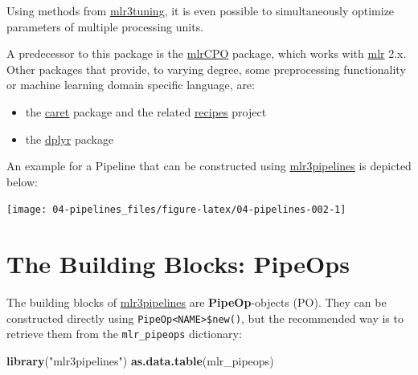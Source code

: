 \documentclass[]{scrbook}
\newenvironment{Shaded}{\begin{snugshade}}{\end{snugshade}}
\newcommand{\KeywordTok}[1]{\textcolor[rgb]{0.13,0.29,0.53}{\textbf{#1}}}
\newcommand{\NormalTok}[1]{#1}
\newcommand{\StringTok}[1]{\textcolor[rgb]{0.31,0.60,0.02}{#1}}
\providecommand{\tightlist}{%
  \setlength{\itemsep}{0pt}\setlength{\parskip}{0pt}}
\renewenvironment{Shaded} {\begin{snugshade}\small} {\end{snugshade}}
\begin{document}
Using methods from \href{https://mlr3tuning.mlr-org.com}{mlr3tuning}, it is even possible to simultaneously optimize parameters of multiple processing units.

A predecessor to this package is the \href{https://cran.r-project.org/package=mlrCPO}{mlrCPO} package, which works with \href{https://cran.r-project.org/package=mlr}{mlr} 2.x.
Other packages that provide, to varying degree, some preprocessing functionality or machine learning domain specific language, are:

\begin{itemize}
\tightlist
\item
  the \href{https://cran.r-project.org/package=caret}{caret} package and the related \href{https://cran.r-project.org/package=recipes}{recipes} project
\item
  the \href{https://cran.r-project.org/package=dplyr}{dplyr} package
\end{itemize}

An example for a Pipeline that can be constructed using \href{https://mlr3pipelines.mlr-org.com}{mlr3pipelines} is depicted below:

\begin{center}\texttt{[image: 04-pipelines\_files/figure-latex/04-pipelines-002-1]} \end{center}

\hypertarget{pipe-pipeops}{%
\section{The Building Blocks: PipeOps}\label{pipe-pipeops}}

The building blocks of \href{https://mlr3pipelines.mlr-org.com}{mlr3pipelines} are \textbf{PipeOp}-objects (PO).
They can be constructed directly using \texttt{PipeOp\textless{}NAME\textgreater{}\$new()}, but the recommended way is to retrieve them from the \texttt{mlr\_pipeops} dictionary:

\begin{Shaded}
\begin{Highlighting}[]
\KeywordTok{library}\NormalTok{(}\StringTok{"mlr3pipelines"}\NormalTok{)}
\KeywordTok{as.data.table}\NormalTok{(mlr_pipeops)}
\end{Highlighting}
\end{Shaded}
\end{document}
